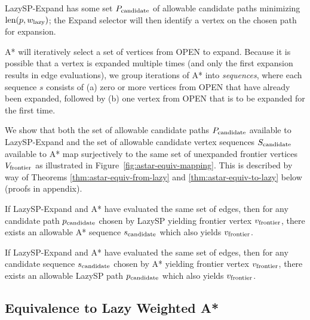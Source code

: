LazySP-Expand has some set $P_{\mbox{\scriptsize candidate}}$ of allowable
candidate paths minimizing $\mbox{len}(p,w_{\mbox{\scriptsize lazy}})$;
the Expand selector will then identify a vertex on the chosen path
for expansion.

A* will iteratively select a set of vertices from OPEN to expand.
Because it is possible that a vertex is expanded multiple times
(and only the first expansion results in edge evaluations),
we group iterations of A* into \emph{sequences},
where each sequence $s$ consists of
(a) zero or more vertices from OPEN that have already been expanded,
followed by (b) one vertex from OPEN that is to be expanded
for the first time.

We show that both the set of allowable candidate paths $P_{\mbox{\scriptsize candidate}}$
available to LazySP-Expand
and the set of allowable candidate vertex sequences $S_{\mbox{\scriptsize candidate}}$
available to A*
map surjectively to the same set of unexpanded frontier vertices $V_{\mbox{\scriptsize frontier}}$
as illustrated in Figure~\ref{fig:astar-equiv-mapping}.
This is described by way of
Theorems \ref{thm:astar-equiv-from-lazy}
and \ref{thm:astar-equiv-to-lazy} below
(proofs in appendix).

\begin{theorem}
If LazySP-Expand and A* have evaluated the same set of edges,
then for any candidate path $p_{\mbox{\scriptsize candidate}}$ chosen by LazySP
yielding frontier vertex $v_{\mbox{\scriptsize frontier}}$,
there exists an allowable A* sequence $s_{\mbox{\scriptsize candidate}}$
which also yields $v_{\mbox{\scriptsize frontier}}$.
\label{thm:astar-equiv-from-lazy}
\end{theorem}

\begin{theorem}
If LazySP-Expand and A* have evaluated the same set of edges,
then for any candidate sequence $s_{\mbox{\scriptsize candidate}}$ chosen by A*
yielding frontier vertex $v_{\mbox{\scriptsize frontier}}$,
there exists an allowable LazySP path $p_{\mbox{\scriptsize candidate}}$
which also yields $v_{\mbox{\scriptsize frontier}}$.
\label{thm:astar-equiv-to-lazy}
\end{theorem}

\subsection{Equivalence to Lazy Weighted A*}


